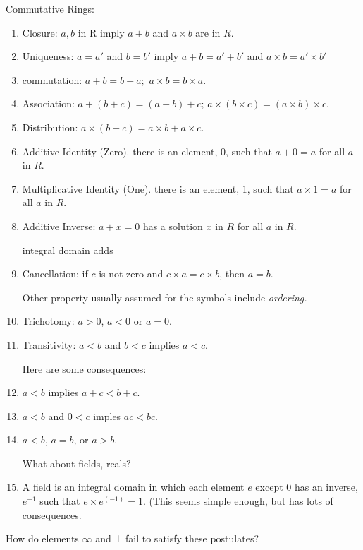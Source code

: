 \documentclass{article}
\begin{document}
Commutative Rings:
\begin{enumerate}
\item %
 Closure:
 $a,b$ in R imply $a+b$ and $a\times b$ are in $R$.
\item %
 Uniqueness: $a=a'$ and $b=b'$ imply $a+b=a'+b'$ and $a\times b
 =a'\times b'$
\item %
commutation:  $a+b=b+a;$ $a\times b=b\times a$.
\item %

Association: $a+(b+c)=(a+b)+c$; $a\times(b\times c)=(a\times b)\times c$.
\item %
Distribution: $a\times (b+c)=a\times b+a\times c$.
\item %
Additive Identity (Zero). there is an element, 0, such that $a+0=a$ for all $a$ in $R$.
\item %
Multiplicative Identity (One). there is an element, 1, such that $a\times 1=a$ for all $a$ in $R$.
\item %
Additive Inverse: $a+x=0$ has a solution $x$ in $R$ for all $a$ in $R$.

integral domain adds

\item Cancellation: if $c$ is not zero and $c \times a=c \times b$, then $a=b$.

Other property usually assumed for the symbols include {\em ordering.}

\item Trichotomy:  $a>0$, $a<0$ or $a=0$.

\item Transitivity: $a<b$ and $b<c$ implies $a<c$.

Here are some consequences:

\item $a<b$ implies $a+c < b+c$.

\item $a<b$ and $0<c$ imples $ ac<bc$.

\item $a<b$, $a=b$, or $a>b$.

What about fields, reals?

\item
A field is an integral domain in which each element $e$ except 0 has an
inverse, $e^{-1}$ such that $e\times e^(-1)=1$. (This seems simple enough, but has lots of consequences.

\end{enumerate}
How do elements $\infty$ and $\bot$ fail to satisfy these postulates?
\end{document}
